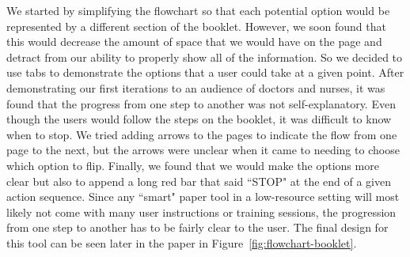 \documentclass{sig-alternate}
\begin{document}
We started by simplifying the flowchart so that each potential option would be represented by a different section of the booklet. However, we soon found that this would decrease the amount of space that we would have on the page and detract from our ability to properly show all of the information. So we decided to use tabs to demonstrate the options that a user could take at a given point. After demonstrating our first iterations to an audience of doctors and nurses, it was found that the progress from one step to another was not self-explanatory. Even though the users would follow the steps on the booklet, it was difficult to know when to stop. We tried adding arrows to the pages to indicate the flow from one page to the next, but the arrows were unclear when it came to needing to choose which option to flip. Finally, we found that we would make the options more clear but also to append a long red bar that said ``STOP" at the end of a given action sequence. Since any ``smart" paper tool in a low-resource setting will most likely not come with many user instructions or training sessions, the progression from one step to another has to be fairly clear to the user. The final design for this tool can be seen later in the paper in Figure~\ref{fig:flowchart-booklet}.

\end{document}
